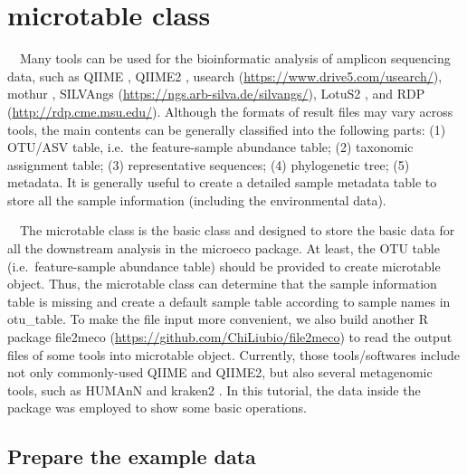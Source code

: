 \documentclass[
]{book}
\begin{document}
\hypertarget{microtable-class}{%
\section{microtable class}\label{microtable-class}}

　Many tools can be used for the bioinformatic analysis of amplicon sequencing data, such as QIIME \citep{Caporaso_QIIME_2010}, QIIME2 \citep{Bolyen_Reproducible_2019},
usearch (\url{https://www.drive5.com/usearch/}), mothur \citep{Schloss_Introducing_2009},
SILVAngs (\url{https://ngs.arb-silva.de/silvangs/}), LotuS2 \citep{Ozkurt_LotuS2_2022},
and RDP (\url{http://rdp.cme.msu.edu/}).
Although the formats of result files may vary across tools, the main contents can be generally classified into the following parts:
(1) OTU/ASV table, i.e.~the feature-sample abundance table;
(2) taxonomic assignment table;
(3) representative sequences;
(4) phylogenetic tree;
(5) metadata.
It is generally useful to create a detailed sample metadata table to store all the sample information (including the environmental data).

　The microtable class is the basic class and designed to store the basic data for all the downstream analysis in the microeco package.
At least, the OTU table (i.e.~feature-sample abundance table) should be provided to create microtable object.
Thus, the microtable class can determine that the sample information table is missing and create a default sample table according to
sample names in otu\_table.
To make the file input more convenient,
we also build another R package file2meco (\url{https://github.com/ChiLiubio/file2meco}) to read the output files of some tools into microtable object.
Currently, those tools/softwares include not only commonly-used QIIME \citep{Caporaso_QIIME_2010} and QIIME2\citep{Bolyen_Reproducible_2019},
but also several metagenomic tools, such as HUMAnN \citep{Franzosa_Species_2018} and kraken2 \citep{Wood_Improved_2019}.
In this tutorial, the data inside the package was employed to show some basic operations.

\hypertarget{prepare-the-example-data}{%
\subsection{Prepare the example data}\label{prepare-the-example-data}}
\end{document}
